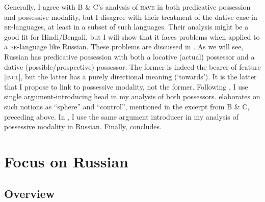 \documentclass[output=paper,colorlinks,citecolor=brown,modfonts,nonflat]{langsci/langscibook}
\begin{document}
Generally, I agree with B \& C’s analysis of \textsc{have} in both predicative possession and possessive modality, but I disagree with their treatment of the dative case in \textsc{be}{}-languages, at least in a subset of such languages. Their analysis might be a good fit for Hindi/Bengali, but I will show that it faces problems when applied to a \textsc{be}-language like Russian. These problems are discussed in . As we will see, Russian has predicative possession with both a locative (actual) possessor and a dative (possible/prospective) possessor. The former is indeed the bearer of feature [\textsc{incl}], but the latter has a purely directional meaning (‘towards’). It is the latter that I propose to link to possessive modality, not the former. Following \citet{TsedrykInPress}, I use  single argument-introducing head in my analysis of both possessors.  elaborates on such notions as “sphere” and “control”, mentioned in the excerpt from B \& C, preceding  above. In , I use the same argument introducer in my analysis of possessive modality in Russian. Finally,  concludes. 

\section{ Focus on Russian}\label{sec:tsedryk:2}

\subsection{Overview}\label{sec:tsedryk:2.1}
\end{document}
